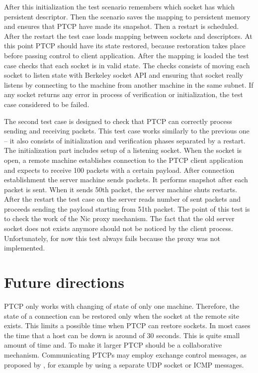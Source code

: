 After this initialization the test scenario remembers which socket has which
persistent descriptor. Then the scenario saves the mapping to persistent memory
and ensures that PTCP have made its snapshot. Then a restart is scheduled.
After the restart the test case loads mapping between sockets and descriptors.
At this point PTCP should have its state restored, because restoration takes
place before passing control to client application. After the mapping is loaded
the test case checks that each socket is in valid state. The checks consists of
moving each socket to listen state with Berkeley socket API and ensuring that
socket really listens by connecting to the machine from another machine in the
same subnet. If any socket returns any error in process of verification or 
initialization, the test case considered to be failed.

The second test case is designed to check that PTCP can correctly process
sending and receiving packets. This test case works similarly to the previous
one -- it also consists of initialization and verification phases separated by
a restart. The initialization part includes setup of a listening socket. When
the socket is open, a remote machine establishes connection to the PTCP client
application and expects to receive 100 packets with a certain payload. After
connection establishment the server machine sends packets. It performs snapshot
after each packet is sent. When it sends 50th packet, the server machine shuts
restarts. After the restart the test case on the server reads number of sent
packets and proceeds sending the payload starting from 51th packet. The point
of this test is to check the work of the Nic proxy mechanism. The fact that
the old server socket does not exists anymore should not be noticed by the
client process. Unfortunately, for now this test always fails because the proxy
was not implemented.

\section{Future directions}

PTCP only works with changing of state of only one machine. Therefore, the
state of a connection can be restored only when the socket at the remote site
exists. This limits a possible time when PTCP can restore sockets. In most
cases the time that a host can be down is around of 30 seconds. This is quite
small amount of time and. To make it larger PTCP should be a collaborative
mechanism. Communicating PTCPs may employ exchange control messages, as
proposed by \cite{rocks_racks}, for example by using a separate UDP socket or
ICMP messages.

